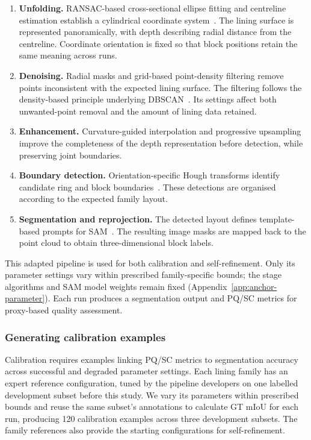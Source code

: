 \documentclass[a4paper,fleqn]{cas-dc}
\begin{document}
\begin{enumerate}
\item \textbf{Unfolding.}
RANSAC-based cross-sectional ellipse fitting and centreline estimation establish a cylindrical coordinate system~\cite{fischler1981ransac}. The lining surface is represented panoramically, with depth describing radial distance from the centreline. Coordinate orientation is fixed so that block positions retain the same meaning across runs.

\item \textbf{Denoising.}
Radial masks and grid-based point-density filtering remove points inconsistent with the expected lining surface. The filtering follows the density-based principle underlying DBSCAN~\cite{ester1996dbscan}. Its settings affect both unwanted-point removal and the amount of lining data retained.

\item \textbf{Enhancement.}
Curvature-guided interpolation and progressive upsampling improve the completeness of the depth representation before detection, while preserving joint boundaries.

\item \textbf{Boundary detection.}
Orientation-specific Hough transforms identify candidate ring and block boundaries~\cite{duda1972hough}. These detections are organised according to the expected family layout.

\item \textbf{Segmentation and reprojection.}
The detected layout defines template-based prompts for SAM~\cite{kirillov2023sam}. The resulting image masks are mapped back to the point cloud to obtain three-dimensional block labels.
\end{enumerate}

This adapted pipeline is used for both calibration and self-refinement. Only its parameter settings vary within prescribed family-specific bounds; the stage algorithms and SAM model weights remain fixed (Appendix~\ref{app:anchor-parameter}). Each run produces a segmentation output and PQ/SC metrics for proxy-based quality assessment.

\subsubsection{Generating calibration examples}
\label{sec:bo-experience}
Calibration requires examples linking PQ/SC metrics to segmentation accuracy across successful and degraded parameter settings. Each lining family has an expert reference configuration, tuned by the pipeline developers on one labelled development subset before this study. We vary its parameters within prescribed bounds and reuse the same subset's annotations to calculate GT mIoU for each run, producing 120 calibration examples across three development subsets. The family references also provide the starting configurations for self-refinement.
\end{document}
